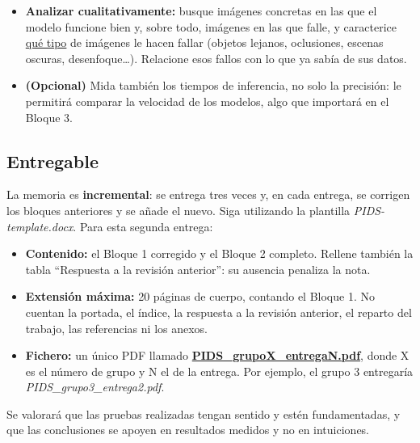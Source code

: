 \documentclass[12pt,a4paper]{article}
\begin{document}
\begin{itemize}
    \item \textbf{Analizar cualitativamente:} busque imágenes concretas en las que el modelo funcione bien y, sobre todo, imágenes en las que falle, y caracterice \underline{qué tipo} de imágenes le hacen fallar (objetos lejanos, oclusiones, escenas oscuras, desenfoque\dots). Relacione esos fallos con lo que ya sabía de sus datos.

    \item \textbf{(Opcional)} Mida también los tiempos de inferencia, no solo la precisión: le permitirá comparar la velocidad de los modelos, algo que importará en el Bloque 3.
\end{itemize}

\subsection{Entregable}
\label{sec:semana2-entregable}

La memoria es \textbf{incremental}: se entrega tres veces y, en cada entrega, se corrigen los bloques anteriores y se añade el nuevo. Siga utilizando la plantilla \textit{PIDS-template.docx}. Para esta segunda entrega:

\begin{itemize}
    \item \textbf{Contenido:} el Bloque 1 corregido y el Bloque 2 completo. Rellene también la tabla ``Respuesta a la revisión anterior'': su ausencia penaliza la nota.
    \item \textbf{Extensión máxima:} 20 páginas de cuerpo, contando el Bloque 1. No cuentan la portada, el índice, la respuesta a la revisión anterior, el reparto del trabajo, las referencias ni los anexos.
    \item \textbf{Fichero:} un único PDF llamado \underline{\textbf{PIDS\_grupoX\_entregaN.pdf}}, donde X es el número de grupo y N el de la entrega. Por ejemplo, el grupo 3 entregaría \textit{PIDS\_grupo3\_entrega2.pdf}.
\end{itemize}

Se valorará que las pruebas realizadas tengan sentido y estén fundamentadas, y que las conclusiones se apoyen en resultados medidos y no en intuiciones.
\end{document}
